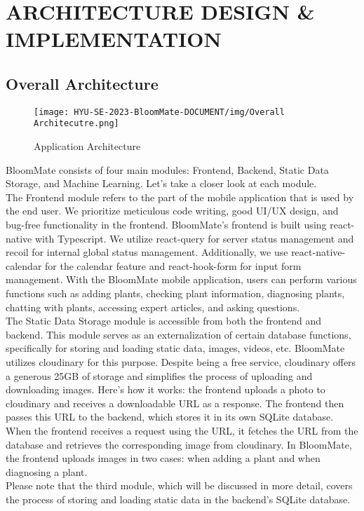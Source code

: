 \documentclass[conference, a4paper]{IEEEtran}
\begin{document}
\section{ARCHITECTURE DESIGN \& IMPLEMENTATION}
\subsection{Overall Architecture}
    \begin{figure}[h]
    \centering
    \texttt{[image: HYU-SE-2023-BloomMate-DOCUMENT/img/Overall Architecutre.png]}
    \label{fig}
    \caption{Application Architecture}
    \end{figure}
BloomMate consists of four main modules: Frontend, Backend, Static Data Storage, and Machine Learning. Let's take a closer look at each module. \\

The Frontend module refers to the part of the mobile application that is used by the end user. We prioritize meticulous code writing, good UI/UX design, and bug-free functionality in the frontend. BloomMate's frontend is built using react-native with Typescript. We utilize react-query for server status management and recoil for internal global status management. Additionally, we use react-native-calendar for the calendar feature and react-hook-form for input form management. With the BloomMate mobile application, users can perform various functions such as adding plants, checking plant information, diagnosing plants, chatting with plants, accessing expert articles, and asking questions.\\
\newline
\indent The Static Data Storage module is accessible from both the frontend and backend. This module serves as an externalization of certain database functions, specifically for storing and loading static data, images, videos, etc. BloomMate utilizes cloudinary for this purpose. Despite being a free service, cloudinary offers a generous 25GB of storage and simplifies the process of uploading and downloading images. Here's how it works: the frontend uploads a photo to cloudinary and receives a downloadable URL as a response. The frontend then passes this URL to the backend, which stores it in its own SQLite database. When the frontend receives a request using the URL, it fetches the URL from the database and retrieves the corresponding image from cloudinary. In BloomMate, the frontend uploads images in two cases: when adding a plant and when diagnosing a plant.\\
\newline
\indent Please note that the third module, which will be discussed in more detail, covers the process of storing and loading static data in the backend's SQLite database.
\end{document}
